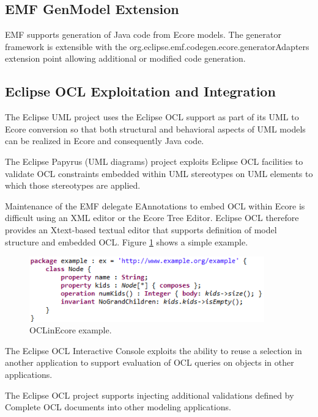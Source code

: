 \documentclass[a4paper]{article}
\begin{document}
\subsection{EMF GenModel Extension}

EMF supports generation of Java code from Ecore models. The generator framework is extensible with the org.eclipse.emf.codegen.ecore.generatorAdapters extension point allowing additional or modified code generation.

\subsection{Eclipse OCL Exploitation and Integration}

The Eclipse UML project uses the Eclipse OCL support as part of its UML to Ecore conversion so that both structural and behavioral aspects of UML models can be realized in Ecore and consequently Java code.

The Eclipse Papyrus (UML diagrams) project exploits Eclipse OCL facilities to validate OCL constraints embedded within UML stereotypes on UML elements to which those stereotypes are applied.

Maintenance of the EMF delegate EAnnotations to embed OCL within Ecore is difficult using an XML editor or the Ecore Tree Editor. Eclipse OCL therefore provides an Xtext-based textual editor that supports definition of model structure and embedded OCL. Figure \ref{fig:OCLinEcore} shows a simple example.
\begin{figure}
  \begin{center}
    \includegraphics[width=4.0in]{OCLinEcore.png}
  \end{center}
  \caption{OCLinEcore example.}
  \label{fig:OCLinEcore}
\end{figure}

The Eclipse OCL Interactive Console exploits the ability to reuse a selection in another application to support evaluation of OCL queries on objects in other applications.

The Eclipse OCL project supports injecting additional validations defined by Complete OCL documents into other modeling applications.
\end{document}
